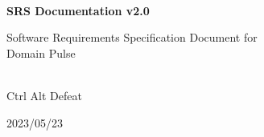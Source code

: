 \begin{titlepage}
    \centering


    
    \vspace{2cm}
    \hrulefill\\
    \vspace{1cm}
    {\Huge\bfseries SRS Documentation v2.0}
    
    \vspace{1cm}
    
    {\Large Software Requirements Specification Document for\\Domain Pulse}\\
    \vspace{1cm}
    \hrulefill\\
    
    \vfill
    
    {\large Ctrl Alt Defeat}
    
    \vspace{1cm}
    
    {\large 2023/05/23}\\
    
\end{titlepage}
  
